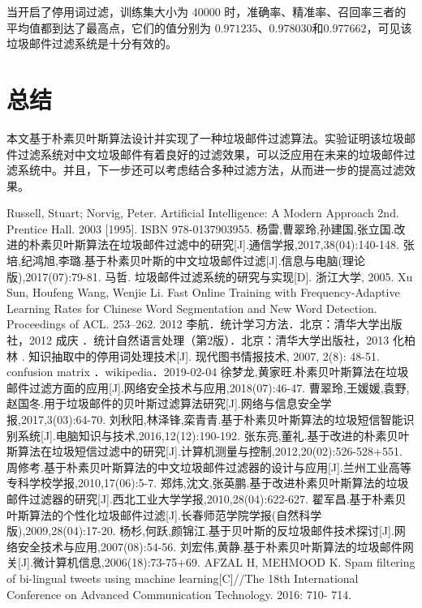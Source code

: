\documentclass[UTF8,zihao=-4]{ctexart}
\begin{document}
	当开启了停用词过滤，训练集大小为 40000 时，准确率、精准率、召回率三者的平均值都到达了最高点，它们的值分别为 $0.971235$、$0.978030$和$0.977662$，可见该垃圾邮件过滤系统是十分有效的。

\section*{总结}
	本文基于朴素贝叶斯算法设计并实现了一种垃圾邮件过滤算法。实验证明该垃圾邮件过滤系统对中文垃圾邮件有着良好的过滤效果，可以泛应用在未来的垃圾邮件过滤系统中。并且，下一步还可以考虑结合多种过滤方法，从而进一步的提高过滤效果。

\begin{thebibliography}{99}
  \linespread{1.25}\songti{}
 Russell, Stuart; Norvig, Peter. Artificial Intelligence: A Modern Approach 2nd. Prentice Hall. 2003 [1995]. ISBN 978-0137903955.
 杨雷,曹翠玲,孙建国,张立国.改进的朴素贝叶斯算法在垃圾邮件过滤中的研究[J].通信学报,2017,38(04):140-148.
 张培,纪鸿旭,李璐.基于朴素贝叶斯的中文垃圾邮件过滤[J].信息与电脑(理论版),2017(07):79-81.
 马哲. 垃圾邮件过滤系统的研究与实现[D]. 浙江大学, 2005.
 Xu Sun, Houfeng Wang, Wenjie Li. Fast Online Training with Frequency-Adaptive Learning Rates for Chinese Word Segmentation and New Word Detection. Proceedings of ACL. 253–262. 2012
 李航．统计学习方法．北京：清华大学出版社，2012
 成庆 ．统计自然语言处理（第2版）．北京：清华大学出版社，2013
 化柏林	. 知识抽取中的停用词处理技术[J]. 现代图书情报技术, 2007, 2(8): 48-51.	
 confusion matrix  ．wikipedia．2019-02-04
 徐梦龙,黄家旺.朴素贝叶斯算法在垃圾邮件过滤方面的应用[J].网络安全技术与应用,2018(07):46-47.
 曹翠玲,王媛媛,袁野,赵国冬.用于垃圾邮件的贝叶斯过滤算法研究[J].网络与信息安全学报,2017,3(03):64-70.
 刘秋阳,林泽锋,栾青青.基于朴素贝叶斯算法的垃圾短信智能识别系统[J].电脑知识与技术,2016,12(12):190-192.
 张东亮,董礼.基于改进的朴素贝叶斯算法在垃圾短信过滤中的研究[J].计算机测量与控制,2012,20(02):526-528+551.
 周修考.基于朴素贝叶斯算法的中文垃圾邮件过滤器的设计与应用[J].兰州工业高等专科学校学报,2010,17(06):5-7.
 郑炜,沈文,张英鹏.基于改进朴素贝叶斯算法的垃圾邮件过滤器的研究[J].西北工业大学学报,2010,28(04):622-627.
 翟军昌.基于朴素贝叶斯算法的个性化垃圾邮件过滤[J].长春师范学院学报(自然科学版),2009,28(04):17-20.
 杨杉,何跃,颜锦江.基于贝叶斯的反垃圾邮件技术探讨[J].网络安全技术与应用,2007(08):54-56.
 刘宏伟,黄静.基于朴素贝叶斯算法的垃圾邮件网关[J].微计算机信息,2006(18):73-75+69.
 AFZAL H, MEHMOOD K. Spam filtering of bi-lingual tweets using machine learning[C]//The 18th International Conference on Advanced Communication Technology. 2016: 710- 714.
\end{thebibliography}
\end{document}
